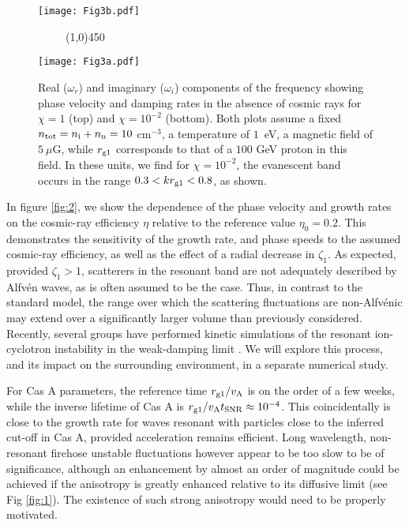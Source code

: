 \documentclass[a4paper,fleqn,usenatbib]{mnras}
\begin{document}
  
\begin{figure*}

	\begin{center}
		\texttt{[image: Fig3b.pdf]} 
			\end{center}
	
~~~~~\line(1,0){450}\\
			\medskip
		\begin{center}
\texttt{[image: Fig3a.pdf]}
	\end{center}
	
	\caption{Real ($\omega_r$) and imaginary ($\omega_i$) components of the frequency showing phase velocity and damping rates in the absence of cosmic rays for $\chi=1$ (top) and $\chi=10^{-2}$ (bottom). Both plots assume a fixed $n_{\rm tot} = n_{\rm i}+n_{\rm n} = 10$ cm$^{-3}$, a temperature of $1$~eV, a magnetic field of $5~\mu$G, while $r_{\rm g1}$ corresponds to that of a $100$ GeV proton in this field. In these units, we find for $\chi=10^{-2}$, the evanescent band occurs in the range $0.3 < k r_{\rm g1} < 0.8$, as shown.}
	\label{fig3}
\end{figure*}

In figure \ref{fig:2}, we show the dependence of the phase velocity and growth rates on the cosmic-ray efficiency $\eta$ relative to the reference value $\eta_0=0.2$. This demonstrates the sensitivity of the growth rate, and phase speeds to the assumed cosmic-ray efficiency, as well as the effect of a radial decrease in $\zeta_1$. 
As expected, provided $\zeta_1>1$, scatterers in the resonant band are not adequately described by Alfv\'en waves, as is often assumed to be the case. 
{ Thus, in contrast to the standard model, the range over which the scattering fluctuations are non-Alfv\'enic may extend over a significantly larger volume than 
previously considered. Recently, several groups have performed kinetic simulations of the resonant ion-cyclotron instability in the weak-damping limit \cite[e.g][]{Holcomb,Bai19}. We will explore this process, and its impact on the surrounding environment, in a separate numerical study. }

For Cas A parameters, the reference time $r_{\rm g1}/v_{\rm A}$ is on the order of a few weeks, while the inverse lifetime of Cas A is $r_{\rm g1}/v_{\rm A} t_{\rm SNR} \approx 10^{-4}$. This coincidentally is close to the growth rate for waves resonant with particles close to the inferred cut-off in Cas A, provided acceleration remains efficient. Long wavelength, non-resonant firehose unstable fluctuations however appear to be too slow to be of significance, although an enhancement by almost an order of magnitude could be achieved if the anisotropy is greatly enhanced relative to its diffusive limit (see Fig \ref{fig:1}). The existence of such strong anisotropy would need to be properly motivated.  
\end{document}
